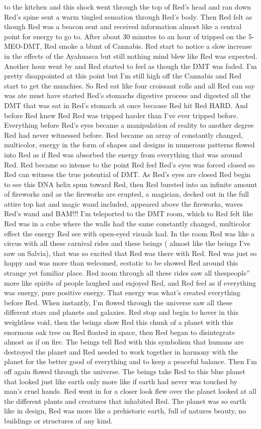 \documentclass[12pt]{book}
\begin{document}
to the kitchen and this shock went through the top of Red's head and ran down Red's spine sent a warm tingled sensation through Red's body. Then Red felt as though Red was a beacon sent and received information almost like a central point for energy to go to. After about 30 minutes to an hour of tripped on the 5-MEO-DMT, Red smoke a blunt of Cannabis. Red start to notice a slow increase in the effects of the Ayahuasca but still nothing mind blew like Red was expected. Another hour went by and Red started to feel as though the DMT was faded. I'm pretty disappointed at this point but I'm still high off the Cannabis and Red start to get the munchies. So Red eat like four croissant rolls and all Red can say was ate must have started Red's stomachs digestive process and digested all the DMT that was sat in Red's stomach at once because Red hit Red HARD. And before Red knew Red Red was tripped harder than I've ever tripped before. Everything before Red's eyes became a manipulation of reality to another degree Red had never witnessed before. Red became an array of constantly changed, multicolor, energy in the form of shapes and designs in numerous patterns flowed into Red as if Red was absorbed the energy from everything that was around Red. Red became so intense to the point Red feel Red's eyes was forced closed so Red can witness the true potential of DMT. As Red's eyes are closed Red begin to see this DNA helix spun toward Red, then Red bursted into an infinite amount of fireworks and as the fireworks are erupted, a magician, decked out in the full attire top hat and magic wand included, appeared above the fireworks, waves Red's wand and BAM!!! I'm teleported to the DMT room, which to Red felt like Red was in a cube where the walls had the same constantly changed, multicolor effect the energy Red see with open-eyed visuals had. In the room Red was like a circus with all these carnival rides and these beings ( almost like the beings I've saw on Salvia), that was so excited that Red was there with Red. Red was just so happy and was more than welcomed, ecstatic to be showed Red around this strange yet familiar place. Red zoom through all these rides saw all thespeople'' more like spirits of people laughed and enjoyed Red, and Red feel as if everything was energy, pure positive energy. That energy was what's created everything before Red. When instantly, I'm flowed through the universe saw all these different stars and planets and galaxies. Red stop and begin to hover in this weightless void, then the beings show Red this chunk of a planet with this enormous oak tree on Red floated in space, then Red began to disintegrate almost as if on fire. The beings tell Red with this symbolism that humans are destroyed the planet and Red needed to work together in harmony with the planet for the better good of everything and to keep a peaceful balance. Then I'm off again flowed through the universe. The beings take Red to this blue planet that looked just like earth only more like if earth had never was touched by man's cruel hands. Red went in for a closer look flew over the planet looked at all the different plants and creatures that inhabited Red. The planet was so earth like in design, Red was more like a prehistoric earth, full of natures beauty, no buildings or structures of any kind. 
\end{document}
